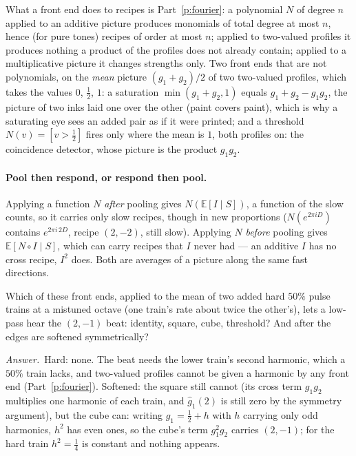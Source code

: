 \documentclass[10pt]{article}
\theoremstyle{plain}
\theoremstyle{definition}
\newcommand{\answer}{\par\smallskip\noindent\textit{Answer.}\ }
\newcommand{\E}{\mathbb{E}}
\begin{document}
What a front end does to recipes is Part~\ref{p:fourier}: a polynomial $N$
of degree $n$ applied to an additive picture produces monomials of total
degree at most $n$, hence (for pure tones) recipes of order at most $n$;
applied to two-valued profiles it produces nothing a product of the
profiles does not already contain; applied to a multiplicative picture it
changes strengths only. Two front ends that are not polynomials, on the
\emph{mean} picture $(g_1+g_2)/2$ of two two-valued profiles, which takes
the values $0$, $\tfrac12$, $1$: a saturation $\min(g_1+g_2,1)$ equals
$g_1+g_2-g_1g_2$, the picture of two inks laid one over the other (paint
covers paint), which is why a saturating eye sees an added pair as if it
were printed; and a threshold $N(v)=[v>\tfrac12]$ fires only where the mean
is $1$, both profiles on: the coincidence detector, whose picture is the
product $g_1g_2$.

\paragraph{Pool then respond, or respond then pool.}
Applying a function $N$ \emph{after} pooling gives $N(\E[I\mid S])$, a
function of the slow counts, so it carries only slow recipes, though in
new proportions ($N(e^{2\pi iD})$ contains $e^{2\pi i\,2D}$, recipe
$(2,-2)$, still slow). Applying $N$ \emph{before} pooling gives
$\E[N\circ I\mid S]$, which can carry recipes that $I$ never had --- an
additive $I$ has no cross recipe, $I^2$ does. Both are averages of a
picture along the same fast directions.

\begin{checkyourself}
Which of these front ends, applied to the mean of two added hard $50\%$
pulse trains at a mistuned octave (one train's rate about twice the
other's), lets a low-pass hear the $(2,-1)$ beat: identity, square, cube,
threshold? And after the edges are softened symmetrically?
\answer Hard: none. The beat needs the lower train's second harmonic, which
a $50\%$ train lacks, and two-valued profiles cannot be given a harmonic by
any front end (Part~\ref{p:fourier}). Softened: the square still cannot
(its cross term $g_1g_2$ multiplies one harmonic of each train, and
$\hat g_1(2)$ is still zero by the symmetry argument), but the cube can:
writing $g_1=\tfrac12+h$ with $h$ carrying only odd harmonics, $h^2$ has
even ones, so the cube's term $g_1^2g_2$ carries $(2,-1)$; for the hard
train $h^2=\tfrac14$ is constant and nothing appears.
\end{checkyourself}
\end{document}
